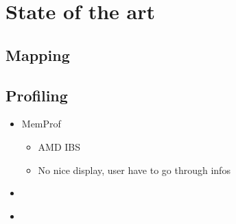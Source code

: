 \section{State of the art}
\label{sec:soa}
\subsection{Mapping}
\label{sec:soa-mapping}
\subsection{Profiling}
\label{sec:soa-profiling}

\begin{itemize}
    \item MemProf \cite{Lachaize12MemProf}
        \begin{itemize}
            \item AMD IBS
            \item No nice display, user have to go through infos
        \end{itemize}
    \item \cite{Majo13(Mis)understanding}
    \item \cite{Jiang14Understanding}
\end{itemize}
